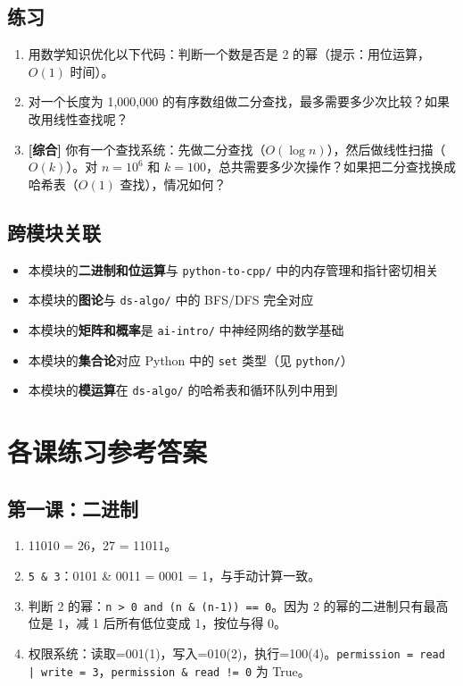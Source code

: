 \documentclass[a4paper,12pt]{ctexart}
\begin{document}
\subsection*{练习}

\begin{enumerate}
  \item 用数学知识优化以下代码：判断一个数是否是 2 的幂（提示：用位运算，$O(1)$ 时间）。
  \item 对一个长度为 1,000,000 的有序数组做二分查找，最多需要多少次比较？如果改用线性查找呢？
  \item \textbf{[综合]} 你有一个查找系统：先做二分查找（$O(\log n)$），然后做线性扫描（$O(k)$）。对 $n = 10^6$ 和 $k = 100$，总共需要多少次操作？如果把二分查找换成哈希表（$O(1)$ 查找），情况如何？
\end{enumerate}

\subsection*{跨模块关联}

\begin{itemize}
  \item 本模块的\textbf{二进制和位运算}与 \texttt{python-to-cpp/} 中的内存管理和指针密切相关
  \item 本模块的\textbf{图论}与 \texttt{ds-algo/} 中的 BFS/DFS 完全对应
  \item 本模块的\textbf{矩阵和概率}是 \texttt{ai-intro/} 中神经网络的数学基础
  \item 本模块的\textbf{集合论}对应 Python 中的 \texttt{set} 类型（见 \texttt{python/}）
  \item 本模块的\textbf{模运算}在 \texttt{ds-algo/} 的哈希表和循环队列中用到
\end{itemize}

\section*{\textcolor{blue!70!black}{各课练习参考答案}}

\subsection*{第一课：二进制}
\begin{enumerate}
  \item 11010 = 26，27 = 11011。
  \item \texttt{5 \& 3}：0101 \& 0011 = 0001 = 1，与手动计算一致。
  \item 判断 2 的幂：\texttt{n > 0 and (n \& (n-1)) == 0}。因为 2 的幂的二进制只有最高位是 1，减 1 后所有低位变成 1，按位与得 0。
  \item 权限系统：读取=001(1)，写入=010(2)，执行=100(4)。\texttt{permission = read | write = 3}，\texttt{permission \& read != 0} 为 True。
\end{enumerate}
\end{document}
